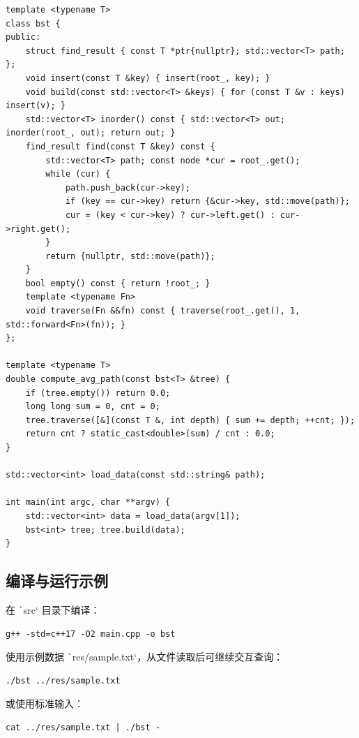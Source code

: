 \documentclass[12pt, a4paper]{ctexart}
\begin{document}
\begin{verbatim}
template <typename T>
class bst {
public:
    struct find_result { const T *ptr{nullptr}; std::vector<T> path; };
    void insert(const T &key) { insert(root_, key); }
    void build(const std::vector<T> &keys) { for (const T &v : keys) insert(v); }
    std::vector<T> inorder() const { std::vector<T> out; inorder(root_, out); return out; }
    find_result find(const T &key) const {
        std::vector<T> path; const node *cur = root_.get();
        while (cur) {
            path.push_back(cur->key);
            if (key == cur->key) return {&cur->key, std::move(path)};
            cur = (key < cur->key) ? cur->left.get() : cur->right.get();
        }
        return {nullptr, std::move(path)};
    }
    bool empty() const { return !root_; }
    template <typename Fn>
    void traverse(Fn &&fn) const { traverse(root_.get(), 1, std::forward<Fn>(fn)); }
};

template <typename T>
double compute_avg_path(const bst<T> &tree) {
    if (tree.empty()) return 0.0;
    long long sum = 0, cnt = 0;
    tree.traverse([&](const T &, int depth) { sum += depth; ++cnt; });
    return cnt ? static_cast<double>(sum) / cnt : 0.0;
}

std::vector<int> load_data(const std::string& path);

int main(int argc, char **argv) {
    std::vector<int> data = load_data(argv[1]);
    bst<int> tree; tree.build(data);
}
\end{verbatim}

\subsection{编译与运行示例}

在 \texttt`src` 目录下编译：

\begin{verbatim}
g++ -std=c++17 -O2 main.cpp -o bst
\end{verbatim}

使用示例数据 \texttt`res/sample.txt`，从文件读取后可继续交互查询：

\begin{verbatim}
./bst ../res/sample.txt
\end{verbatim}

或使用标准输入：

\begin{verbatim}
cat ../res/sample.txt | ./bst -
\end{verbatim}
\end{document}
